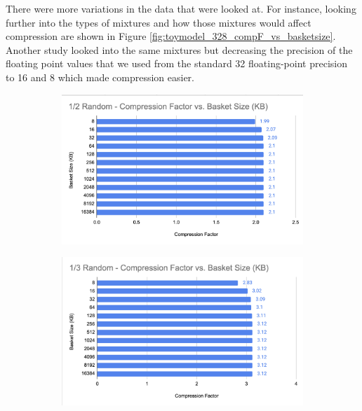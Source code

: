 There were more variations in the data that were looked at. 
For instance, looking further into the types of mixtures and how those mixtures would affect compression are shown in Figure \ref{fig:toymodel_328_compF_vs_basketsize}. 
Another study looked into the same mixtures but decreasing the precision of the floating point values that we used from the standard 32 floating-point precision to 16 and 8 which made compression easier. 

\begin{figure}[h]
    \centering
    \begin{subfigure}{.5\textwidth}
        \centering
        \includegraphics[width=\textwidth]{content/toymodel_content/3.28/1_of_2.png}
        \label{fig:toymodel_328_compF_vs_basketsize_subA}
      \end{subfigure}%
      \begin{subfigure}{.5\textwidth}
        \centering
        \includegraphics[width=\textwidth]{content/toymodel_content/3.28/1_of_3.png}

\end{subfigure}
\end{figure}
